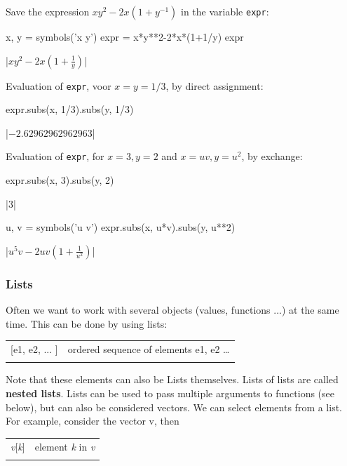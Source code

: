 \begin{example}
Save the expression $xy^2-2x(1+y^{-1})$ in the variable 	 \lstinline{expr}:
\begin{pyin}
x, y = symbols('x y')
expr = x*y**2-2*x*(1+1/y)
expr
\end{pyin}
\begin{pyout}
|$xy^2 - 2x\left(1+\frac{1}{y}\right)$|
\end{pyout}	
Evaluation of \lstinline{expr}, voor $x=y=1/3$, by direct assignment:
\begin{pyin}
expr.subs(x, 1/3).subs(y, 1/3)
\end{pyin}
\begin{pyout}
|$-2.62962962962963$|
\end{pyout}

Evaluation of \lstinline{expr}, for $x=3, y=2$ and $x= uv , y = u^2$, by exchange:
\begin{pyin}
expr.subs(x, 3).subs(y, 2)
\end{pyin}
\begin{pyout}
|$3$|
\end{pyout}
\begin{pyin}
u, v = symbols('u v')
expr.subs(x, u*v).subs(y, u**2)
\end{pyin}
\begin{pyout}
|$u^5v-2uv\left(1+\frac{1}{u^2}\right)$|
\end{pyout}
\end{example}

\subsubsection{Lists}
Often we want to work with several objects (values, functions ...) at the same time. This can be done by using lists:

\begin{tabular}{>{\hfill}p{6cm}p{11cm}}
	[e1, e2, ... ]		&	ordered sequence of elements e1, e2 \ldots\\
	\multicolumn{2}{l}{} 
\end{tabular}

Note that these elements can also be Lists themselves. Lists of lists are called \textbf{nested lists}. Lists can be used to pass multiple arguments to functions (see below), but can also be considered vectors. We can select elements from a list. For example, consider the vector v, then 

\begin{tabular}{>{\hfill}p{6cm}p{11cm}}
	\textit{v}[\textit{k}]		&		element \textit{k} in \textit{v} \\
	\multicolumn{2}{l}{} 
\end{tabular}


